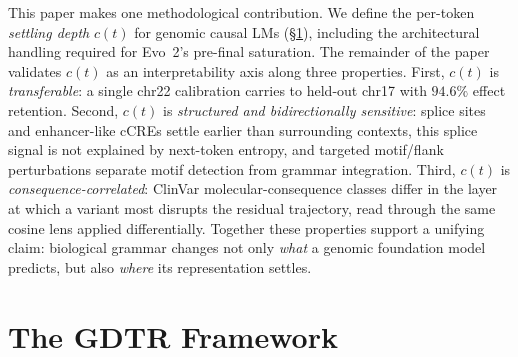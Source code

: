 \documentclass{article}
\theoremstyle{plain}
\theoremstyle{definition}
\theoremstyle{remark}
\newcommand{\gDTR}{\textsc{GDTR}}
\begin{document}
This paper makes one methodological contribution. We define the per-token \emph{settling depth} $c(t)$ for genomic causal LMs (\S\ref{sec:framework}), including the architectural handling required for Evo~2's pre-final saturation. The remainder of the paper validates $c(t)$ as an interpretability axis along three properties. First, $c(t)$ is \emph{transferable}: a single chr22 calibration carries to held-out chr17 with $94.6\%$ effect retention. Second, $c(t)$ is \emph{structured and bidirectionally sensitive}: splice sites and enhancer-like cCREs settle earlier than surrounding contexts, this splice signal is not explained by next-token entropy, and targeted motif/flank perturbations separate motif detection from grammar integration. Third, $c(t)$ is \emph{consequence-correlated}: ClinVar molecular-consequence classes differ in the layer at which a variant most disrupts the residual trajectory, read through the same cosine lens applied differentially. Together these properties support a unifying claim: biological grammar changes not only \emph{what} a genomic foundation model predicts, but also \emph{where} its representation settles.

\section{The \gDTR{} Framework}
\label{sec:framework}
\end{document}
